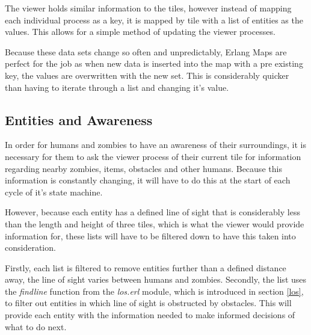 The viewer holds similar information to the tiles, however instead of mapping each individual process as a key, it is mapped by tile with a list of entities as the values. This allows for a simple method of updating the viewer processes.

Because these data sets change so often and unpredictably, Erlang Maps are perfect for the job as when new data is inserted into the map with a pre existing key, the values are overwritten with the new set. This is considerably quicker than having to iterate through a list and changing it's value.

\subsection{Entities and Awareness}
\label{viewer_intro}
In order for humans and zombies to have an awareness of their surroundings, it is necessary for them to ask the viewer process of their current tile for information regarding nearby zombies, items, obstacles and other humans. Because this information is constantly changing, it will have to do this at the start of each cycle of it's state machine.

However, because each entity has a defined line of sight that is considerably less than the length and height of three tiles, which is what the viewer would provide information for, these lists will have to be filtered down to have this taken into consideration.

Firstly, each list is filtered to remove entities further than a defined distance away, the line of sight varies between humans and zombies. Secondly, the list uses the \emph{findline} function from the \emph{los.erl} module, which is introduced in section \ref{los}, to filter out entities in which line of sight is obstructed by obstacles. This will provide each entity with the information needed to make informed decisions of what to do next.

